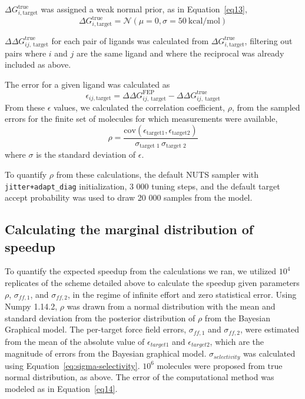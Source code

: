 \documentclass[phd,tocprelim]{cornell}
\begin{document}
$\Delta G^\text{true}_{i,\text{target}}$ was assigned a weak normal prior, as in Equation~\ref{eq13},
\begin{equation}
\Delta G^\text{true}_{i,\text{target}} = \mathcal{N}(\mu=0, \sigma=50~\text{kcal/mol}) \label{eq13}
\end{equation}

$\Delta \Delta G^\text{true}_{ij, ~\text{target}}$ for each pair of ligands was calculated from $\Delta G^\text{true}_{i,\text{target}}$, filtering out pairs where $i$ and $j$ are the same ligand and where the reciprocal was already included as above. 

The error for a given ligand was calculated as
\begin{equation}
\epsilon_{ij, \text{target}} =  \Delta \Delta G^\text{FEP}_{ij, ~\text{target}} - \Delta \Delta G^\text{true}_{ij, ~\text{target}} \label{eq9}
\end{equation}
From these $\epsilon$ values, we calculated the correlation coefficient, $\rho$, from the sampled errors for the finite set of molecules for which measurements were available,
\begin{equation}
\rho = \frac{\mathrm{cov}(\epsilon_\text{target1}, \epsilon_\text{target2})}{\sigma_\text{target 1} \, \sigma_\text{target 2}} \label{eq10}
\end{equation}
where $\sigma$ is the standard deviation of $\epsilon$. 

To quantify $\rho$ from these calculations, the default NUTS sampler with {\tt jitter+adapt\_diag} initialization, 3 000 tuning steps, and the default target accept probability was used to draw 20 000 samples from the model. 

\subsection{Calculating the marginal distribution of speedup}

To quantify the expected speedup from the calculations we ran, we utilized $10^4$ replicates of the scheme detailed above to calculate the speedup given parameters $\rho$, $\sigma_{ff,1}$, and $\sigma_{ff,2}$, in the regime of infinite effort and zero statistical error. 
Using Numpy 1.14.2, $\rho$ was drawn from a normal distribution with the mean and standard deviation from the posterior distribution of $\rho$ from the Bayesian Graphical model. 
The per-target force field errors, $\sigma_{ff,1}$ and $\sigma_{ff,2}$, were estimated from the mean of the absolute value of  $\epsilon_{target1}$ and $\epsilon_{target2}$, which are the magnitude of errors from the Bayesian graphical model. $\sigma_{selectivity}$ was calculated using Equation~\ref{eq:sigma-selectivity}. 
$10^6$ molecules were proposed from true normal distribution, as above. 
The error of the computational method was modeled as in Equation~\ref{eq14}. 
\end{document}
